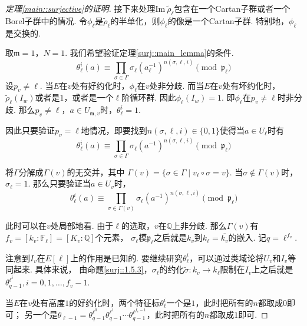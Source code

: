 \begin{proof}[定理\ref{main::surjective}的证明]
    \vskip0.3cm

    接下来处理$\mathrm{Im}\ \tilde{\rho}_{\ell}$包含在一个Cartan子群或者一个Borel子群中的情况.
    令$\phi_{\ell}$是$\tilde{\rho}_{\ell}$的半单化，则$\phi_{\ell}$的像是一个Cartan子群.
    特别地，$\phi_{\ell}$是交换的.

    取$\mathfrak{m}=1$，$N=1$. 我们希望验证定理\ref{surj::main_lemma}的条件.
    \begin{equation}
        \theta_{\ell}^i (a) \equiv \prod_{\sigma\in \Gamma} \sigma_{\ell}(a_{\ell}^{-1})^{n(\sigma, \ell,i)}
        \pmod{\mathfrak{p}_{\ell}}
    \end{equation}
    设$p_v\neq \ell$. 当$E$在$v$处有好约化时，$\phi_{\ell}$在$v$处非分歧.
    而当$E$在$v$处有坏约化时，$\tilde{\rho}_{\ell}(I_w)$或者是$1$，或者是一个$\ell$阶循环群.
    因此$\phi_{\ell}(I_w)=1$. 即$\phi_{\ell}$在$p_v\neq \ell$时非分歧.
    那么$p_v\neq \ell$，$a\in U_{\mathfrak{m}, v}$时，$\theta_{\ell}^{i} = 1$.

    因此只要验证$p_v=\ell$地情况，即要找到$n(\sigma, \ell,i)\in \{0, 1\}$使得当$a\in U_{\ell}$时有
    \begin{equation}
        \theta_{\ell}^i (a) \equiv \prod_{\sigma\in \Gamma} \sigma_{\ell}(a^{-1})^{n(\sigma, \ell,i)}
        \pmod{\mathfrak{p}_{\ell}}
    \end{equation}

    将$\Gamma$分解成$\Gamma(v)$的无交并，其中
    $\Gamma(v) = \{\sigma\in \Gamma\mid v_{\ell}\circ\sigma = v\}$.
    当$\sigma\not\in \Gamma(v)$时，$\sigma_{\ell} = 1$.
    那么只要验证当$a\in U_v$时，
    \begin{equation}
        \theta_{\ell}^i (a) \equiv \prod_{\sigma\in \Gamma(v)} \sigma_{\ell}(a^{-1})^{n(\sigma,\ell,i)}
        \pmod{\mathfrak{p}_{\ell}}
    \end{equation}
    
    此时可以在$v$处局部地看.
    由于$\ell$的选取，$v$在$\mathbb{Q}$上非分歧.
    那么$\Gamma(v)$有$f_v = [k_v:\mathbb{F}_{\ell}] = [K_v:\mathbb{Q}]$个元素，
    $\sigma_{\ell}$模$\mathfrak{p}_{\ell}$之后就是$k_v$到$k_{\ell}=\overline{k_v}$的嵌入. 记$q=\ell^{f_v}$.

    注意到$I_v$在$E[\ell]$上的作用是已知的.
    要继续研究$\theta_{\ell}^{i}$，可以通过类域论将$U_v$和$I_v$等同起来. 具体来说，
    由命题\ref{surj::1.5.3}，$\sigma_{\ell}$的约化$\tilde{\sigma}:k_v\to k_{\ell}$限制在$I_v$上之后就是$\theta_{q-1}^{\ell^i},i=0,1,\ldots,f_v-1$.

    当$E$在$v$处有高度$1$的好约化时，两个特征标$\theta_{\ell}^i$一个是$1$，此时把所有的$n$都取成$0$即可；
    另一个是$\theta_{\ell - 1} = \theta_{q-1}^{\ell^0} \theta_{q-1}^{\ell^1}\cdots \theta_{q-1}^{\ell^{f_v-1}}$，此时把所有的$n$都取成$1$即可.


\end{proof}
